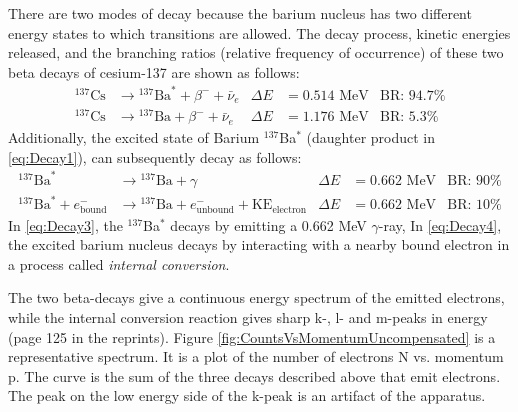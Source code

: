 \documentclass{../lab}
\begin{document}
There are two modes of decay because the barium nucleus has two different energy states to which transitions are allowed. The decay process, kinetic energies released, and the branching ratios (relative frequency of occurrence) of these two beta decays of cesium-137 are shown as follows:
\begin{align}
    \label{eq:Decay1}
    ^{137}\text{Cs} &\rightarrow {}^{137}\text{Ba}^* + \beta^- + \bar{\nu}_e
        & \Delta E &= 0.514 \text{ MeV}
        & \text{BR: } 94.7\% \\
    \label{eq:Decay2}
    ^{137}\text{Cs} &\rightarrow {}^{137}\text{Ba} + \beta^- + \bar{\nu}_e
        & \Delta E &= 1.176 \text{ MeV}
        & \text{BR: } 5.3\%
\end{align}
Additionally, the excited state of Barium $^{137}$Ba$^*$ (daughter product in \eqref{eq:Decay1}), can subsequently decay as follows:
\begin{align}
    \label{eq:Decay3}
    ^{137}\text{Ba}^* &\rightarrow {}^{137}\text{Ba} + \gamma
        & \Delta E &= 0.662 \text{ MeV}
        & \text{BR: } 90\% \\
    \label{eq:Decay4}
    ^{137}\text{Ba}^* + e_\text{bound}^- &\rightarrow {}^{137}\text{Ba} + e_\text{unbound}^- + \text{KE}_\text{electron}
        & \Delta E &= 0.662 \text{ MeV}
        & \text{BR: } 10\%
\end{align}
In \eqref{eq:Decay3}, the $^{137}$Ba$^*$ decays by emitting a 0.662 MeV $\gamma$-ray, In \eqref{eq:Decay4}, the excited barium nucleus decays by interacting with a nearby bound electron in a process called \emph{internal conversion}.

The two beta-decays give a continuous energy spectrum of the emitted electrons, while the internal conversion reaction gives sharp k-, l- and m-peaks in energy (page 125 in the reprints). Figure \ref{fig:CountsVsMomentumUncompensated} is a representative spectrum. It is a plot of the number of electrons N vs. momentum p. The curve is the sum of the three decays described above that emit electrons. The peak on the low energy side of the k-peak is an artifact of the apparatus.
\end{document}
